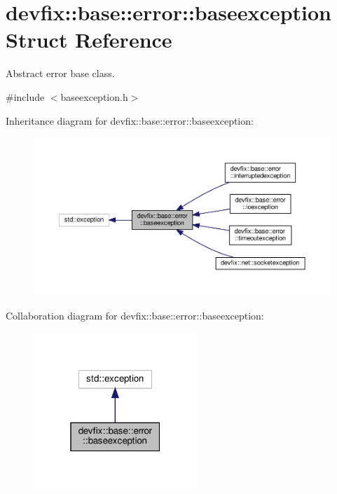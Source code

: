 \hypertarget{structdevfix_1_1base_1_1error_1_1baseexception}{}\section{devfix\+:\+:base\+:\+:error\+:\+:baseexception Struct Reference}
\label{structdevfix_1_1base_1_1error_1_1baseexception}


Abstract error base class.  




{\ttfamily \#include $<$baseexception.\+h$>$}



Inheritance diagram for devfix\+:\+:base\+:\+:error\+:\+:baseexception\+:\nopagebreak
\begin{figure}[H]
\begin{center}
\leavevmode
\includegraphics[width=350pt]{structdevfix_1_1base_1_1error_1_1baseexception__inherit__graph}
\end{center}
\end{figure}


Collaboration diagram for devfix\+:\+:base\+:\+:error\+:\+:baseexception\+:\nopagebreak
\begin{figure}[H]
\begin{center}
\leavevmode
\includegraphics[width=175pt]{structdevfix_1_1base_1_1error_1_1baseexception__coll__graph}
\end{center}
\end{figure}
